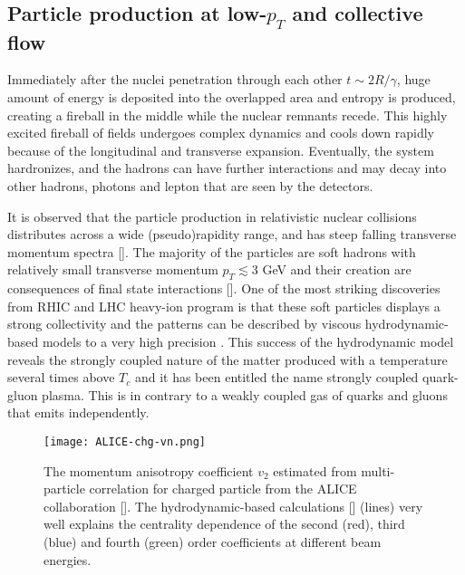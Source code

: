 \subsection{Particle production at low-$p_T$ and collective flow} 
Immediately after the nuclei penetration through each other $t\sim 2R/\gamma$, huge amount of energy is deposited into the overlapped area and entropy is produced, creating a fireball in the middle while the nuclear remnants recede.
This highly excited fireball of fields undergoes complex dynamics and cools down rapidly because of the longitudinal and transverse expansion.
Eventually, the system hardronizes, and the hadrons can have further interactions and may decay into other hadrons, photons and lepton that are seen by the detectors.

It is observed that the particle production in relativistic nuclear collisions distributes across a wide (pseudo)rapidity range, and has steep falling transverse momentum spectra [].
The majority of the particles are soft hadrons with relatively small transverse momentum $p_T \lesssim 3$ GeV and their creation are consequences of final state interactions [].
One of the most striking discoveries from RHIC and LHC heavy-ion program is that these soft particles displays a strong collectivity and the patterns can be described by viscous hydrodynamic-based models to a very high precision \cite{Dusling:2007gi,Song:2008si,Schenke:2010nt,Petersen:2008dd,Niemi:2015qia,Bernhard:2016tnd,Bernhard:2018hnz}.
This success of the hydrodynamic model reveals the strongly coupled nature of the matter produced with a temperature several times above $T_c$ and it has been entitled the name strongly coupled quark-gluon plasma.
This is in contrary to a weakly coupled gas of quarks and gluons that emits independently.

\begin{figure}
\centering
\texttt{[image: ALICE-chg-vn.png]}
\caption{The momentum anisotropy coefficient $v_2$ estimated from multi-particle correlation for charged particle from the ALICE collaboration [].
The hydrodynamic-based calculations [] (lines) very well explains the centrality dependence of the second (red), third (blue) and fourth (green) order coefficients at different beam energies.}
\label{fig:intro:vn}
\end{figure}

